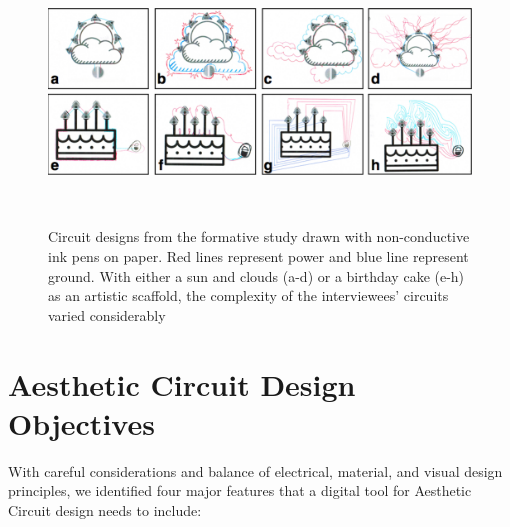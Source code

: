 \documentclass{sigchi}
\begin{document}


\begin{figure}
\centering
  \includegraphics[width=1\columnwidth]{figures/Ellustrate_figures_formative_user_design}
  \caption{Circuit designs from the formative study drawn with non-conductive ink pens on paper. Red lines represent power and blue line represent ground. With either a sun and clouds (a-d) or a birthday cake (e-h) as an artistic scaffold, the complexity of the interviewees' circuits varied considerably }~\label{fig:formative_user_design}
  \vspace{-20pt}
\end{figure}

\section{Aesthetic Circuit Design Objectives}
With careful considerations and balance of electrical, material, and visual design principles, we identified four major features that a digital tool for Aesthetic Circuit design needs to include: 
\end{document}

